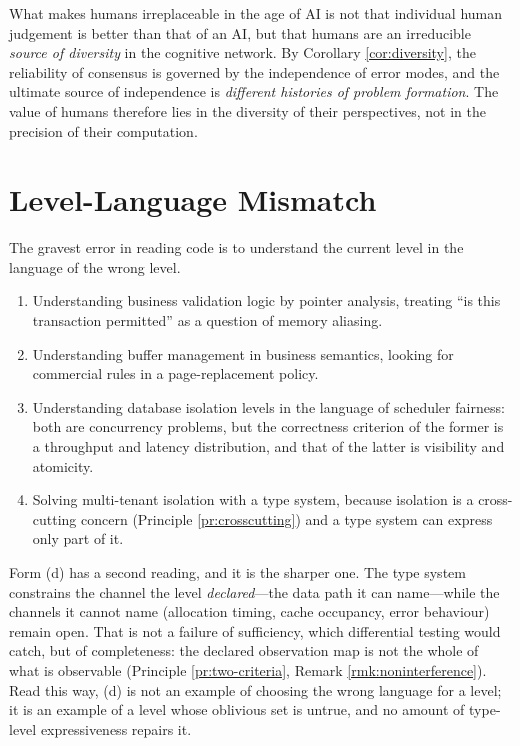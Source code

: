 \begin{principle}\label{pr:human-diversity}
What makes humans irreplaceable in the age of AI is not that individual human judgement is
better than that of an AI, but that humans are an irreducible \emph{source of diversity} in
the cognitive network. By Corollary \ref{cor:diversity}, the reliability of consensus is
governed by the independence of error modes, and the ultimate source of independence is
\emph{different histories of problem formation}. The value of humans therefore lies in the
diversity of their perspectives, not in the precision of their computation.
\end{principle}

\section{Level-Language Mismatch}\label{sec:antipattern}

\begin{principle}\label{pr:level-language}
The gravest error in reading code is to understand the current level in the language of the
wrong level.
\end{principle}

\begin{example}\label{ex:wrong-language}
\begin{enumerate}[label=(\alph*)]
\item Understanding business validation logic by pointer analysis, treating ``is this
      transaction permitted'' as a question of memory aliasing.
\item Understanding buffer management in business semantics, looking for commercial rules in
      a page-replacement policy.
\item Understanding database isolation levels in the language of scheduler fairness: both are
      concurrency problems, but the correctness criterion of the former is a throughput and
      latency distribution, and that of the latter is visibility and atomicity.
\item Solving multi-tenant isolation with a type system, because isolation is a cross-cutting
      concern (Principle \ref{pr:crosscutting}) and a type system can express only part of it.
\end{enumerate}
Form (d) has a second reading, and it is the sharper one. The type system constrains the channel the
level \emph{declared}---the data path it can name---while the channels it cannot name (allocation
timing, cache occupancy, error behaviour) remain open. That is not a failure of sufficiency, which
differential testing would catch, but of completeness: the declared observation map is not the
whole of what is observable (Principle \ref{pr:two-criteria}, Remark \ref{rmk:noninterference}).
Read this way, (d) is not an example of choosing the wrong language for a level; it is an example of
a level whose oblivious set is untrue, and no amount of type-level expressiveness repairs it.
\end{example}

